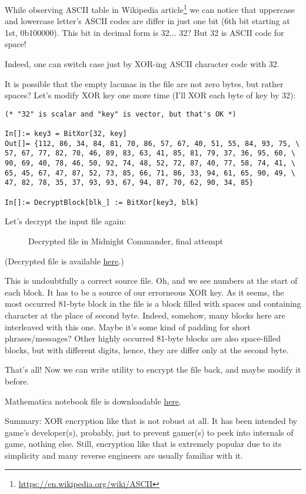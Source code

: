 While observing ASCII table in Wikipedia article\footnote{\url{https://en.wikipedia.org/wiki/ASCII}}
we can notice that uppercase and lowercase letter's ASCII codes are differ in just one bit
(6th bit starting at 1st, 0b100000).
This bit in decimal form is 32... 32? But 32 is ASCII code for space!

Indeed, one can switch case just by XOR-ing ASCII character code with 32.

It is possible that the empty lacunas in the file are not zero bytes, but rather spaces?
Let's modify XOR key one more time (I'll XOR each byte of key by 32):

\begin{lstlisting}
(* "32" is scalar and "key" is vector, but that's OK *)

In[]:= key3 = BitXor[32, key]
Out[]= {112, 86, 34, 84, 81, 70, 86, 57, 67, 40, 51, 55, 84, 93, 75, \
57, 67, 77, 82, 70, 46, 89, 83, 63, 41, 85, 81, 79, 37, 36, 95, 60, \
90, 69, 40, 78, 46, 50, 92, 74, 48, 52, 72, 87, 40, 77, 58, 74, 41, \
65, 45, 67, 47, 87, 52, 73, 85, 66, 71, 86, 33, 94, 61, 65, 90, 49, \
47, 82, 78, 35, 37, 93, 93, 67, 94, 87, 70, 62, 90, 34, 85}

In[]:= DecryptBlock[blk_] := BitXor[key3, blk]
\end{lstlisting}

Let's decrypt the input file again:

\begin{figure}[H]
\centering
{}
\caption{Decrypted file in Midnight Commander, final attempt}
\end{figure}

(Decrypted file is available \href{http://yurichev.com/blog/XOR_mask_1/files/decrypted.dat}{here}.)

This is undoubtfully a correct source file.
Oh, and we see numbers at the start of each block. It has to be a source of our errorneous XOR key.
As it seems, the most occurred 81-byte block in the file is a block filled with spaces and containing  character at the place of second byte.
Indeed, somehow, many blocks here are interleaved with this one.
Maybe it's some kind of padding for short phrases/messages?
Other highly occurred 81-byte blocks are also space-filled blocks, but with different digits, hence, they are differ only at the second byte.

That's all! Now we can write utility to encrypt the file back, and maybe modify it before.

Mathematica notebook file is downloadable \href{http://yurichev.com/blog/XOR_mask_1/files/XOR_mask_1.nb}{here}.

Summary: XOR encryption like that is not robust at all. It has been intended by game's developer(s), probably, just to prevent gamer(s) to peek into internals of game, nothing else.
Still, encryption like that is extremely popular due to its simplicity and many reverse engineers are usually familiar with it.

